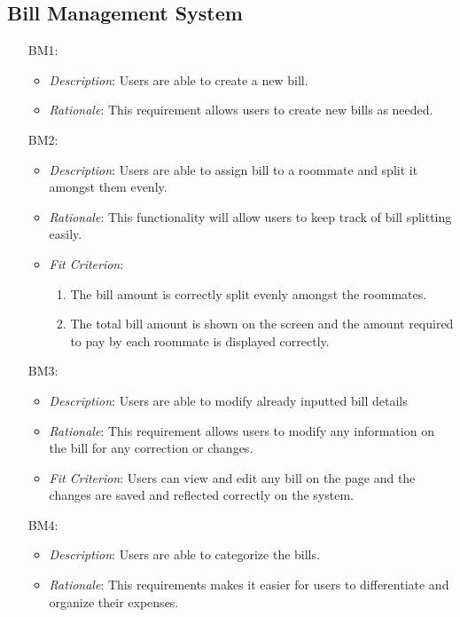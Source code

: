 \documentclass[12pt]{article}
\begin{document}
\subsection{Bill Management System}
\noindent \begin{itemize}
    \item[BM1:] 
    \begin{itemize}
        \item \textit{Description}: Users are able to create a new bill.
        \item \textit{Rationale}: This requirement allows users to create new bills as needed.
    \end{itemize}
    \item[BM2:] 
    \begin{itemize}
        \item \textit{Description}: Users are able to assign bill to a roommate and split it amongst them evenly.
        \item \textit{Rationale}: This functionality will allow users to keep track of bill splitting easily.
        \item \textit{Fit Criterion}: 
        \begin{enumerate}
            \item The bill amount is correctly split evenly amongst the roommates.
            \item The total bill amount is shown on the screen and the amount required to pay by each roommate is displayed correctly.
        \end{enumerate}
    \end{itemize}
    \item[BM3:] 
    \begin{itemize}
        \item \textit{Description}: Users are able to modify already inputted bill details 
        \item \textit{Rationale}: This requirement allows users to modify any information on the bill for any correction or changes.
        \item \textit{Fit Criterion}: Users can view and edit any bill on the page and the changes are saved and reflected correctly on the system.
    \end{itemize}
    \item[BM4:] 
    \begin{itemize}
        \item \textit{Description}: Users are able to categorize the bills.
        \item \textit{Rationale}: This requirements makes it easier for users to differentiate and organize their expenses.

\end{itemize}
\end{itemize}
\end{document}
